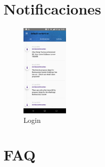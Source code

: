 \section{Notificaciones}

\begin{figure}[!h]
	\begin{center}
		\includegraphics[width=0.2\textwidth]{./img/anexo1/notificaciones_all.png}
		\caption{Login}
		\label{fig:notificaciones}
	\end{center}
\end{figure}

\section{FAQ}
